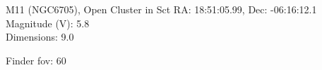 \begin{block}{M11 (NGC6705), Open Cluster in Sct}
    RA: 18:51:05.99, Dec: -06:16:12.1 \\ 
    Magnitude (V): 5.8 \\ 
    Dimensions: 9.0 

    Finder fov: 60 
\end{block}